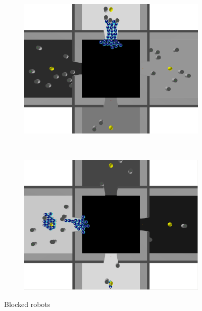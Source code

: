 \begin{figure}[h!]
\begin{subfigure}[b]{0.5\textwidth}
                \includegraphics[width=\textwidth]{images/blocked_entrance2.png}
        \end{subfigure}%
        ~
        \begin{subfigure}[b]{0.5\textwidth}
                \includegraphics[width=\textwidth]{images/blocked_forces.png}
        \end{subfigure}
        \caption{Blocked robots}\label{fig:blocked}
\end{figure}

